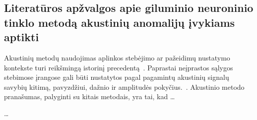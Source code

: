 \subsection*{Literatūros apžvalgos apie giluminio neuroninio tinklo metodą akustinių anomalijų įvykiams aptikti}\label{chap:onelt}
Akustinių metodų naudojimas aplinkos stebėjimo ar pažeidimų nustatymo kontekste turi reikšmingą istorinį precedentą~\citep{Simonovic2021, Vicuna2017}. Paprastai neįprastos sąlygos stebimose įrangose gali būti nustatytos pagal pagamintų akustinių signalų savybių kitimą, pavyzdžiui, dažnio ir amplitudės pokyčius.~\citep{Holford2017, Cooper2020}. Akustinio metodo pranašumas, palyginti su kitais metodais, yra tai, kad \dots

\dots
